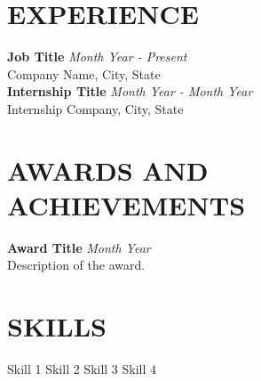 
\section*{\faKey{} EXPERIENCE}
    \noindent
    \textbf{Job Title} \hfill \textit{Month Year - Present} \\
    Company Name, City, State \\

    \noindent
    \textbf{Internship Title} \hfill \textit{Month Year - Month Year} \\
    Internship Company, City, State \\



\section*{\faTrophy{} AWARDS AND ACHIEVEMENTS}
    \noindent
    \textbf{Award Title} \hfill \textit{Month Year} \\
    Description of the award.


\section*{\faCode{} SKILLS}
    \noindent
    Skill 1  \quad Skill 2 \newline  
    Skill 3  \quad Skill 4
